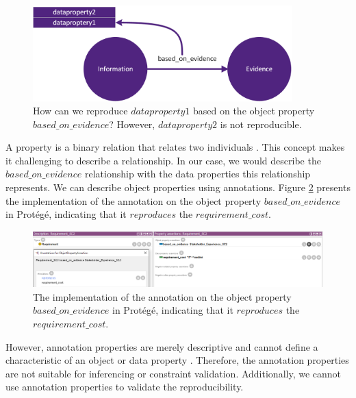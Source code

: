 \begin{figure}[H]
\centering
  \includegraphics[width=10cm]{../../Images/04_Contribution/04_DecisionDesignPattern_NARY1.png}
  \caption{How can we reproduce $dataproperty1$ based on the object property $based\_on\_evidence$? However, $dataproperty2$ is not reproducible.}
  \label{fig:DecisionDesignPattern_NARY1}
\end{figure}

A property is a binary relation that relates two individuals \parencite{WEB16}. This concept makes it challenging to describe a relationship. In our case, we would describe the $based\_on\_evidence$ relationship with the data properties this relationship represents. We can describe object properties using annotations. Figure \ref{fig:DecisionDesignPattern_NARY2} presents the implementation of the annotation on the object property $based\_on\_evidence$ in Prot\'eg\'e, indicating that it $reproduces$ the $requirement\_cost$. 

\begin{figure}[H]
\centering
  \includegraphics[width=16cm]{../../Images/04_Contribution/04_DecisionDesignPattern_NARY2.png}
  \caption{The implementation of the annotation on the object property $based\_on\_evidence$ in Prot\'eg\'e, indicating that it $reproduces$ the $requirement\_cost$.}
  \label{fig:DecisionDesignPattern_NARY2}
\end{figure}

However, annotation properties are merely descriptive and cannot define a characteristic of an object or data property \parencite{WEB12}. Therefore, the annotation properties are not suitable for inferencing or constraint validation. Additionally, we cannot use annotation properties to validate the reproducibility.

